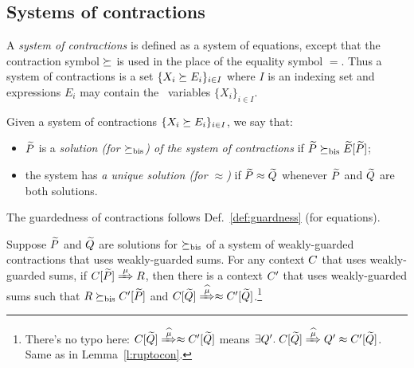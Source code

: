 \subsection{Systems of contractions}
\label{ss:SysContr}

A \emph{system of contractions} is defined as a system of equations,
except that the contraction symbol $\mathrel{\succeq}$ is used in the place of
the equality symbol $=$. Thus a system of contractions is a set 
$\{  X_i \mathrel{\succeq} E_i\}_{i\in I}$
where $I$ is an  indexing set and expressions
$E_i$  may contain the  \behavC\  variables 
$\{  X_i\}_{i\in I}$.

\begin{definition}
\label{d:uniContra}
Given a system of contractions 
$\{  X_i \mathrel{\succeq} E_i\}_{i\in I}$, 
 we say that:
\begin{itemize}
\item $\widetilde P$ is a \emph{solution (for $\mathrel{\succeq_{\rm{bis}}}$) of the 
 system of contractions} if $\widetilde P \mathrel{\succeq_{\rm{bis}}} \widetilde E [\widetilde P]$;
\item the system has \emph{a unique solution (for $\approx$)}
if $\widetilde P \approx \widetilde Q$ whenever $\widetilde P$ and $\widetilde Q$ are both solutions.
\end{itemize}
\end{definition}

The guardedness of contractions follows Def.~\ref{def:guardness} (for equations).


\begin{lemma}
\label{l:uptocon}
Suppose $\widetilde P$ and $\widetilde Q$ are solutions  for $\mathrel{\succeq_{\rm{bis}}}$
 of a system of weakly-guarded contractions that uses 
weakly-guarded sums.
For any context $C$  that uses 
weakly-guarded sums,
if  $\ct{\til P}\Arr{\mu}  R$,
 then 
there is a context $C'$  that uses 
weakly-guarded sums
such that $R \mathrel{\succeq_{\rm{bis}}} C' [\widetilde P]$ and $\ct{\til Q} \Arcap{\mu}
 \wb \ctp{\til Q}$.\footnote{There's no typo here: $\ct{\til Q} \Arcap{\mu} \wb \ctp{\til
     Q}$ means $\exists Q'.\; \ct{\til Q} \Arcap{\mu} Q'
   \wb \ctp{\til Q}$. Same as in Lemma~\ref{l:ruptocon}.}
\end{lemma}

